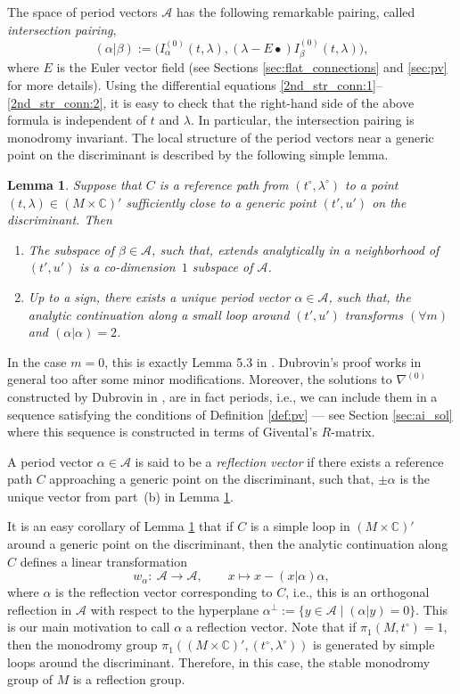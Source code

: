 \documentclass[10pt,a4paper]{article}
\numberwithin{equation}{section}
\newtheorem{Lemma}[Theorem]{Lemma}
\newcommand{\CC}{\mathbb{C}}
\newcommand{\A}{\mathcal{A}}
\begin{document}
The space of period vectors $\A$ has the following remarkable pairing, called {\em intersection pairing},
\[
(\alpha|\beta):=\big(I^{(0)}_\alpha(t,\lambda), (\lambda-E\bullet) I^{(0)}_\beta(t,\lambda)\big),
\]
where $E$ is the Euler vector field (see Sections \ref{sec:flat_connections} and \ref{sec:pv} for more details). Using the differential equations \eqref{2nd_str_conn:1}--\eqref{2nd_str_conn:2}, it is easy to check that the right-hand side of the above formula is independent of $t$ and $\lambda$. In particular, the intersection pairing is monodromy invariant. The local structure of the period vectors near a generic point on the discriminant is described by the following simple lemma.
\begin{Lemma}\label{le:local_mon}
Suppose that $C$ is a reference path from $(t^\circ,\lambda^\circ)$ to a point $(t,\lambda)\in (M\times \CC)'$ sufficiently close to a generic point $(t',u')$ on the discriminant. Then
\begin{enumerate}\itemsep=0pt
\item[$(a)$]
The subspace of $\beta\in \A$, such that,  extends analytically in a neighborhood of~$(t',u')$ is a co-dimension~$1$ subspace of $\A$.
\item[$(b)$]
Up to a sign, there exists a unique period vector $\alpha\in \A$, such
that, the analytic continuation along a small loop around $(t',u')$
transforms  $(\forall m)$ and ${(\alpha|\alpha)=2}$.
\end{enumerate}
\end{Lemma}
In the case $m=0$, this is exactly Lemma 5.3 in
\cite{Dubrovin1999}. Dubrovin's proof works in general too after
some minor modifications. Moreover, the solutions to $\nabla^{(0)}$ constructed by
Dubrovin in \cite[Lemma~5.3]{Dubrovin1999}, are in fact periods, i.e.,
we can include them in a sequence satisfying the conditions of
Definition \ref{def:pv} --- see Section \ref{sec:ai_sol} where this sequence
is constructed in terms of Givental's $R$-matrix.
\begin{Definition}\label{def:rv}
A period vector $\alpha\in \A$ is said to be a {\em reflection vector}
if there exists a reference path $C$ approaching a generic point on
the discriminant, such that, $\pm\alpha$ is the unique vector from
part~(b) in Lemma \ref{le:local_mon}.

\end{Definition}
It is an easy corollary of Lemma \ref{le:local_mon} that if $C$ is a
simple loop in $(M\times \CC)'$ around a generic point on the
discriminant, then the analytic continuation along $C$ defines a
linear transformation
\[
w_\alpha\colon\ \A\to \A, \qquad x\mapsto x-(x|\alpha)\alpha,
\]
where $\alpha$ is the reflection vector corresponding to $C$, i.e.,
this is an orthogonal reflection in $\A$ with respect to the
hyperplane $\alpha^\perp:=\{ y\in \A\mid  (\alpha|y)=0\}$. This is our
main motivation to call $\alpha$ a reflection vector. Note that if
$\pi_1(M,t^\circ)=1$, then the monodromy group $\pi_1((M\times
\CC)',\allowbreak(t^\circ,\lambda^\circ))$ is generated by simple loops around
the discriminant. Therefore, in this case, the stable monodromy group
of $M$ is a reflection group.
\end{document}
